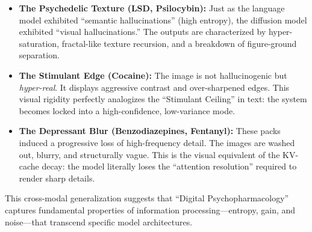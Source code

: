 \documentclass[10pt]{article}
\begin{document}
\begin{itemize}
    \item \textbf{The Psychedelic Texture (LSD, Psilocybin):} Just as the language model exhibited ``semantic hallucinations'' (high entropy), the diffusion model exhibited ``visual hallucinations.'' The outputs are characterized by hyper-saturation, fractal-like texture recursion, and a breakdown of figure-ground separation.
    \item \textbf{The Stimulant Edge (Cocaine):} The image is not hallucinogenic but \textit{hyper-real}. It displays aggressive contrast and over-sharpened edges. This visual rigidity perfectly analogizes the ``Stimulant Ceiling'' in text: the system becomes locked into a high-confidence, low-variance mode.
    \item \textbf{The Depressant Blur (Benzodiazepines, Fentanyl):} These packs induced a progressive loss of high-frequency detail. The images are washed out, blurry, and structurally vague. This is the visual equivalent of the KV-cache decay: the model literally loses the ``attention resolution'' required to render sharp details.
\end{itemize}

This cross-modal generalization suggests that ``Digital Psychopharmacology'' captures fundamental properties of information processing—entropy, gain, and noise—that transcend specific model architectures.
\end{document}
